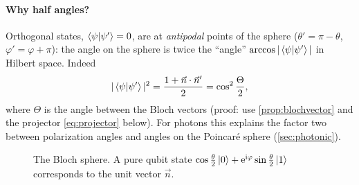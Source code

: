 \paragraph{Why half angles?} Orthogonal states, $\left\langle\psi\middle|\psi'\right\rangle=0$, are at \emph{antipodal} points of the sphere ($\theta'=\pi-\theta$,
$\varphi'=\varphi+\pi$): the angle on the sphere is twice the ``angle'' $\arccos|\left\langle\psi\middle|\psi'\right\rangle|$ in Hilbert space. Indeed
\begin{equation}\label{eq:overlapbloch}
  |\left\langle\psi\middle|\psi'\right\rangle|^2=\frac{1+\vec n\cdot\vec n'}2=\cos^2\frac{\Theta}2,
\end{equation}
where $\Theta$ is the angle between the Bloch vectors (proof: use \cref{prop:blochvector} and the projector \cref{eq:projector} below).
For photons this explains the factor two between polarization angles and angles on the Poincaré sphere (\cref{sec:photonic}).

\begin{figure}[h]\centering
{}
\caption{The Bloch sphere. A pure qubit state $\cos\frac\theta2\left|0\right\rangle+\mathrm e^{\mathrm i\varphi}\sin\frac\theta2\left|1\right\rangle$ corresponds to the unit vector $\vec n$.}
\label{fig:bloch}
\end{figure}

